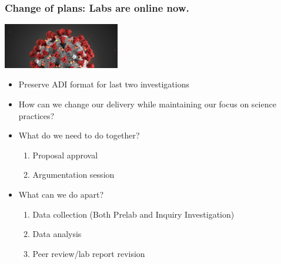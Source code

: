 \documentclass[aspectratio=169,shadow=true]{beamer}
\begin{document}
\begin{frame}
\begin{center}
\end{center}
\end{frame}

\begin{frame}
\frametitle{Change of plans: Labs are online now.}
\begin{center}
\includegraphics[width=2in]{coronavirus.jpg}
\end{center}
\begin{itemize}
\item<1-> Preserve ADI format for last two investigations
\item<2-> How can we change our delivery while maintaining our focus on science practices?
\item<3-> What do we need to do together?
\begin{enumerate}
\item Proposal approval
\item Argumentation session
\end{enumerate}
\item<4-> What can we do apart?
\begin{enumerate}
\item Data collection (Both Prelab and Inquiry Investigation)
\item Data analysis
\item Peer review/lab report revision
\end{enumerate}
\end{itemize}
\end{frame}
\end{document}
